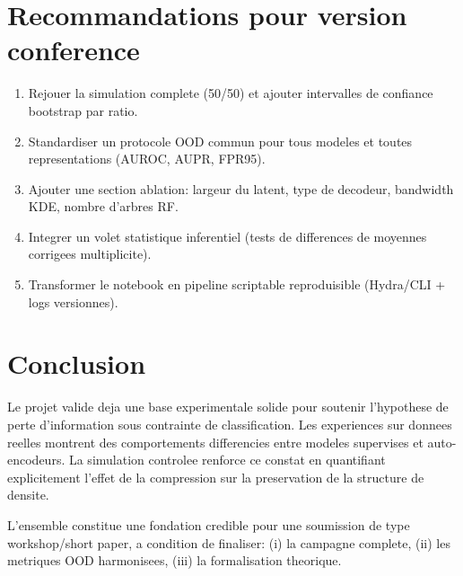 \documentclass[11pt,a4paper]{article}
\begin{document}
\section{Recommandations pour version conference}
\begin{enumerate}[leftmargin=1.2cm]
    \item Rejouer la simulation complete (50/50) et ajouter intervalles de confiance bootstrap par ratio.
    \item Standardiser un protocole OOD commun pour tous modeles et toutes representations (AUROC, AUPR, FPR95).
    \item Ajouter une section ablation: largeur du latent, type de decodeur, bandwidth KDE, nombre d'arbres RF.
    \item Integrer un volet statistique inferentiel (tests de differences de moyennes corrigees multiplicite).
    \item Transformer le notebook en pipeline scriptable reproduisible (Hydra/CLI + logs versionnes).
\end{enumerate}

\section{Conclusion}
Le projet valide deja une base experimentale solide pour soutenir l'hypothese de perte d'information sous contrainte de classification. Les experiences sur donnees reelles montrent des comportements differencies entre modeles supervises et auto-encodeurs. La simulation controlee renforce ce constat en quantifiant explicitement l'effet de la compression sur la preservation de la structure de densite.

L'ensemble constitue une fondation credible pour une soumission de type workshop/short paper, a condition de finaliser: (i) la campagne complete, (ii) les metriques OOD harmonisees, (iii) la formalisation theorique.

\appendix
\end{document}
